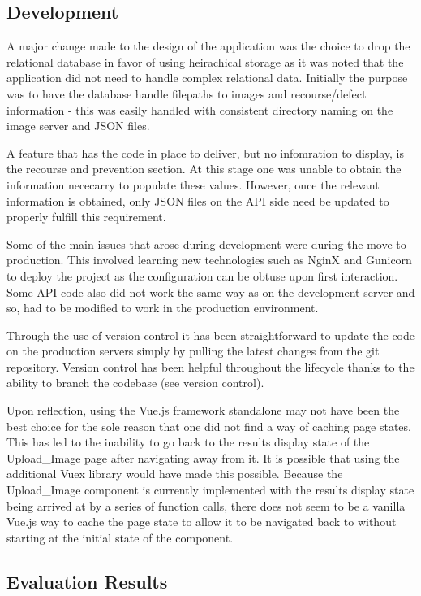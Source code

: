   \subsection{Development}
    A major change made to the design of the application was the choice to drop the relational database in favor of using heirachical storage as it was noted that the application did not need to handle complex relational data. Initially the purpose was to have the database handle filepaths to images and recourse/defect information - this was easily handled with consistent directory naming on the image server and JSON files.
    \par
    A feature that has the code in place to deliver, but no infomration to display, is the recourse and prevention section. At this stage one was unable to obtain the information nececarry to populate these values. However, once the relevant information is obtained, only JSON files on the API side need be updated to properly fulfill this requirement.
    \par
    Some of the main issues that arose during development were during the move to production. This involved learning new technologies such as NginX and Gunicorn to deploy the project as the configuration can be obtuse upon first interaction. Some API code also did not work the same way as on the development server and so, had to be modified to work in the production environment.
    \par
    Through the use of version control it has been straightforward to update the code on the production servers simply by pulling the latest changes from the git repository. Version control has been helpful throughout the lifecycle thanks to the ability to branch the codebase (see version control).
    \par
    Upon reflection, using the Vue.js framework standalone may not have been the best choice for the sole reason that one did not find a way of caching page states. This has led to the inability to go back to the results display state of the Upload_Image page after navigating away from it. It is possible that using the additional Vuex library would have made this possible. Because the Upload_Image component is currently implemented with the results display state being arrived at by a series of function calls, there does not seem to be a vanilla Vue.js way to cache the page state to allow it to be navigated back to without starting at the initial state of the component.
    \subsection{Evaluation Results}
